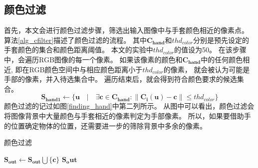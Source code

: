 \subsection{颜色过滤}
首先，本文会进行颜色过滤步骤，筛选出输入图像中与手套颜色相近的像素点。
算法\ref{alg_cfilter}描述了颜色过滤的流程。
其中$\bm{C_{hand}}$和$thd_{color}$分别是预先设定的手套颜色的集合和颜色距离阈值。
本文的实验中$thd_{color}$的值设为50。
在该步骤中，会遍历RGB图像的每一个像素。
如果该像素的颜色和$\bm{C_{hand}}$中的任何颜色相近,
即在RGB颜色空间中与相应颜色距离小于$thd_{color}$的像素，
就会被认为可能是手部的像素，并入待选集合中。
遍历结束后，就会得到符合颜色要求的候选集合。
\begin{equation}
    \bm{S_{hand1}} \gets
    \{
    \bm{u} \quad
    | \quad
    \exists \bm{c} \in \bm{C_{hand}} :
    \| \bm{C_i}(\bm{u}) - \bm{c}\| \leq thd_{color}
    \}
\end{equation}
颜色过滤的记过如图\ref{finding_hand}中第二列所示。
从图中可以看出，颜色过滤会将图像背景中大量颜色与手套相近的像素判定为手部像素。
所以，如果要借助手的位置确定物体的位置，还需要进一步的筛除背景中多余的像素。
\begin{algorithm}
    \caption{颜色过滤}
    \label{alg_cfilter}
    \begin{algorithmic}[1]
                    \State $\bm{S_{out}} \gets \bm{S_{out}} \bigcup \{\bm{c}\}$
                    \EndIf
                \EndFor
            \EndFor 
            \State \Return $\bm{S_out}$
        \EndFunction
    \end{algorithmic}
\end{algorithm}
